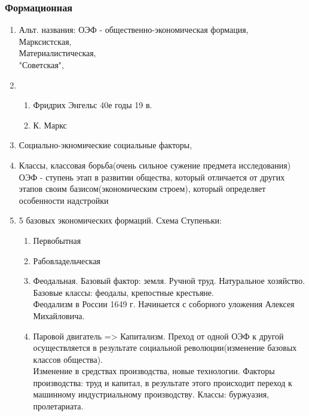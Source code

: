 \documentclass[a4paper]{article}
\begin{document}
\subsubsection{Формационная}
\begin{enumerate}
    \item Альт. названия:
    ОЭФ - общественно-экономическая формация, \\
    Марксистская, \\
    Материалистическая, \\
    "Советская", \\
    \item
        \begin{enumerate}
        \item Фридрих Энгельс 40е годы 19 в.
        \item К. Маркс
        \end{enumerate}
    \item Социально-экномические социальные факторы,
    \item Классы, классовая борьба(очень сильное сужение предмета исследования) \\
        ОЭФ - ступень этап в развитии общества, который отличается от других этапов своим базисом(экономическим строем), который определяет особенности надстройки
    \item 5 базовых экономических формаций. Схема Ступеньки:
    \begin{enumerate}
        \item Первобытная
        \item Рабовладельческая
        \item Феодальная. Базовый фактор: земля. Ручной труд. Натуральное хозяйство. Базовые классы: феодалы, крепостные крестьяне. \\
        Феодализм в России 1649 г. Начинается с соборного уложения Алексея Михайловича.
        \item Паровой двигатель => Капитализм. Преход от одной ОЭФ к другой осуществляется в результате социальной революции(изменение базовых классов общества). \\ Изменение в средствах производства, новые технологии. Факторы производства: труд и капитал, в результате этого происходит переход к машинному индустриальному производству. Классы: буржуазия, пролетариата.
    \end{enumerate}



\end{enumerate}
\end{document}
